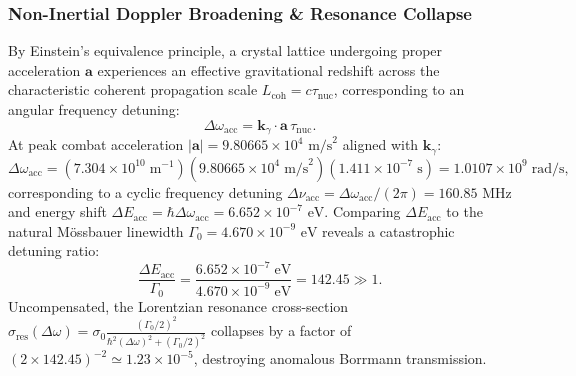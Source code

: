 \documentclass[11pt,onecolumn]{article}
\begin{document}
\subsubsection{Non-Inertial Doppler Broadening \& Resonance Collapse}
By Einstein's equivalence principle, a crystal lattice undergoing proper acceleration $\mathbf{a}$ experiences an effective gravitational redshift across the characteristic coherent propagation scale $L_{\mathrm{coh}} = c\tau_{\mathrm{nuc}}$, corresponding to an angular frequency detuning:
\begin{equation}
\Delta\omega_{\mathrm{acc}} = \mathbf{k}_\gamma \cdot \mathbf{a}\,\tau_{\mathrm{nuc}}.
\end{equation}
At peak combat acceleration $|\mathbf{a}| = 9.80665 \times 10^4\text{ m/s}^2$ aligned with $\mathbf{k}_\gamma$:
\begin{equation}
\Delta\omega_{\mathrm{acc}} = (7.304 \times 10^{10}\;\mathrm{m}^{-1})(9.80665 \times 10^4\;\mathrm{m/s}^2)(1.411 \times 10^{-7}\;\mathrm{s}) = 1.0107 \times 10^9\;\mathrm{rad/s},
\end{equation}
corresponding to a cyclic frequency detuning $\Delta\nu_{\mathrm{acc}} = \Delta\omega_{\mathrm{acc}} / (2\pi) = 160.85\text{ MHz}$ and energy shift $\Delta E_{\mathrm{acc}} = \hbar\Delta\omega_{\mathrm{acc}} = 6.652 \times 10^{-7}\text{ eV}$. Comparing $\Delta E_{\mathrm{acc}}$ to the natural M\"ossbauer linewidth $\Gamma_0 = 4.670 \times 10^{-9}\text{ eV}$ reveals a catastrophic detuning ratio:
\begin{equation}
\frac{\Delta E_{\mathrm{acc}}}{\Gamma_0} = \frac{6.652 \times 10^{-7}\;\mathrm{eV}}{4.670 \times 10^{-9}\;\mathrm{eV}} = 142.45 \gg 1.
\end{equation}
Uncompensated, the Lorentzian resonance cross-section $\sigma_{\mathrm{res}}(\Delta\omega) = \sigma_0 \frac{(\Gamma_0/2)^2}{\hbar^2(\Delta\omega)^2 + (\Gamma_0/2)^2}$ collapses by a factor of $(2 \times 142.45)^{-2} \simeq 1.23 \times 10^{-5}$, destroying anomalous Borrmann transmission.
\end{document}
